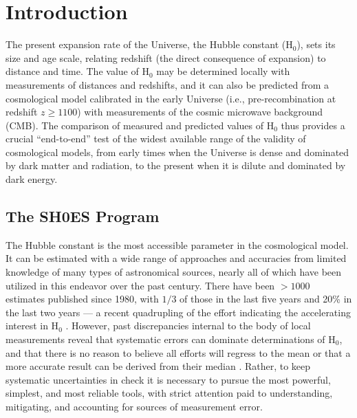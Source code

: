 \documentclass[12pt]{aastex631}
\begin{document}
\clearpage


\tableofcontents

\clearpage 

\section{Introduction}

The present expansion rate of the Universe, the Hubble constant (H$_0$), sets its size and age scale, relating redshift (the direct consequence of expansion) to distance and time.  The value of H$_0$ may be determined locally with measurements of distances and redshifts, and it can also be predicted from a cosmological model calibrated in the early Universe (i.e., pre-recombination at redshift $z \geq 1100$) with measurements of the cosmic microwave background (CMB).  The comparison of measured and predicted values of H$_0$ thus provides a crucial ``end-to-end'' test of the widest available range of the validity of cosmological models, from early times when the Universe is dense and dominated by dark matter and radiation, to the present when it is dilute and dominated by dark energy.  

\subsection{The SH0ES Program\label{sc:1.1}}

The Hubble constant is the most accessible parameter in the cosmological model.  It can be estimated with a wide range of approaches and accuracies from limited knowledge of many types of astronomical sources, nearly all of which have been utilized in this endeavor over the past century.  There have been $>1000$ estimates published since 1980, with $1/3$ of those in the last five years and 20\% in the last two years --- a recent quadrupling of the effort indicating the accelerating interest in H$_0$ \citep{Steer:2020}.  However, past discrepancies internal to the body of local measurements reveal that systematic errors can dominate determinations of H$_0$, and that there is no reason to believe all efforts will regress to the mean or that a more accurate result can be derived from their median \citep{Chen:2011}.  Rather, to keep systematic uncertainties in check it is necessary to pursue the most powerful, simplest, and most reliable tools, with strict attention paid to understanding, mitigating, and accounting for sources of measurement error.  
\end{document}
